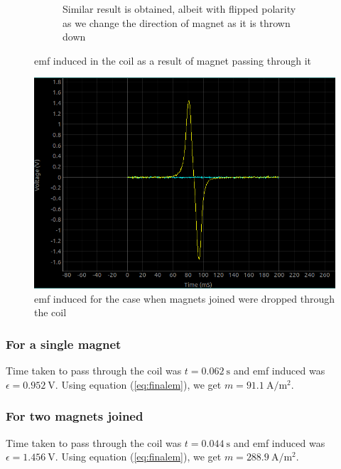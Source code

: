 \documentclass[%
 aip,
 amsmath,amssymb,
 reprint, floatfix%
]{revtex4-1}
\begin{document}
\begin{figure}
\begin{subfigure}[b]{0.5\textwidth}
            \caption{Similar result is obtained, albeit with flipped polarity as we change the direction of magnet as it is thrown down}
            \label{fig:em3}
        \end{subfigure}
            \caption{emf induced in the coil as a result of magnet passing through it}
            \label{fig:em}
    \end{figure}
    \begin{figure}[h!]
        \centering
        \includegraphics[scale = 0.25]{Figures/two magnet normal 22.2 mid ie 11.1.png}
        \caption{emf induced for the case when magnets joined were dropped through the coil}
        \label{fig:twomag}
    \end{figure}
    \subsubsection{For a single magnet}
    Time taken to pass through the coil was $t = \SI{0.062}{\second}$ and emf induced was $\epsilon = \SI{0.952}{\volt}$. Using equation (\ref{eq:finalem}), we get $m = \SI{91.1}{\ampere \per \metre \squared}$.
    \subsubsection{For two magnets joined}
    Time taken to pass through the coil was $t = \SI{0.044}{\second}$ and emf induced was $\epsilon = \SI{1.456}{\volt}$. Using equation (\ref{eq:finalem}), we get $m = \SI{288.9}{\ampere \per \metre \squared}$.
\end{document}
